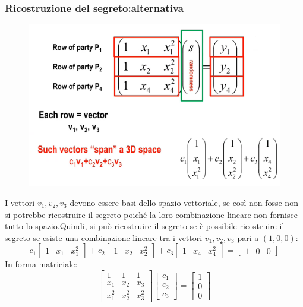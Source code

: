 \documentclass{book}
\begin{document}
\subsubsection{Ricostruzione del segreto:alternativa}
\begin{figure}[h]
	\centering
	\includegraphics[scale=0.5]{2022-01-07-12-25-58.png}%
\end{figure}
I vettori \(v_{1},v_{2},v_{3}\) devono essere basi dello spazio vettoriale, se così non fosse non si potrebbe ricostruire il segreto poiché la loro combinazione lineare non fornisce tutto lo spazio\@.\newline Quindi, si può ricostruire il segreto se è possibile ricostruire il segreto se esiste una combinazione lineare tra i vettori \(v_{1},v_{2},v_{3}\) pari a \((1,0,0)\):\begin{equation*}
	c_{1}\begin{bmatrix}
		1 & x_{1} & x_{1}^2
	\end{bmatrix}+c_{2}\begin{bmatrix}
		1 & x_{2} & x_{2}^{2}
	\end{bmatrix}+c_{3}\begin{bmatrix}
		1 & x_{4} & x_{4}^{2}
	\end{bmatrix}=\begin{bmatrix}
		1 & 0 & 0
	\end{bmatrix}
\end{equation*}
In forma matriciale:\begin{equation*}
    \begin{bmatrix}
        1&1&1\\x_{1}&x_{2}&x_{3}\\x_{1}^{2}&x_{2}^{2}&x_{3}^{2}
    \end{bmatrix}\begin{bmatrix}
        c_{1}\\c_{2}\\c_{3}
    \end{bmatrix}=\begin{bmatrix}
        1\\0\\0
    \end{bmatrix}
\end{equation*}
\end{document}
